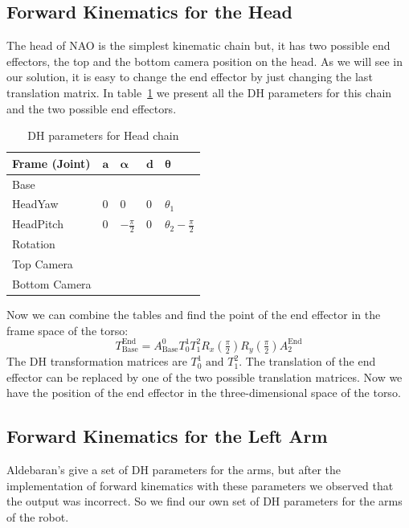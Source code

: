 \subsection{Forward Kinematics for the Head}
The head of NAO is the simplest kinematic chain but, it has two possible end effectors, the top and the bottom camera position on the head. As we will see in our solution, it is easy to change the end effector by just changing the last translation matrix. In table~\ref{tab:DHhead} we present all the DH parameters for this chain and the two possible end effectors. 
\begin{table}[h]
\centering
\caption{DH parameters for Head chain}
\begin{tabular}{|l|>{\centering\arraybackslash}m{2.55cm}|>{\centering\arraybackslash}m{2.55cm}|>{\centering\arraybackslash}m{2.55cm}|>{\centering\arraybackslash}m{2.55cm}|}
\hline
\textbf{Frame (Joint)} & $\mathbf{a}$ & $\boldsymbol{\alpha}$ & $\mathbf{d}$ & $\boldsymbol{\theta}$\\ \hline
Base & \multicolumn{4}{c|}{$A(0,0,\text{\footnotesize{NeckOffsetZ}})$} \\ \hline
HeadYaw & $0$ & $0$ & $0$ & $\theta_1$ \\ \hline
HeadPitch & $0$ & $-\frac{\pi}{2}$ & $0$ & $\theta_2 - \frac{\pi}{2}$ \\ \hline
Rotation & \multicolumn{4}{c|}{$R_x(\frac{\pi}{2})R_y(\frac{\pi}{2})$} \\ \hline
Top Camera & \multicolumn{4}{c|}{$A(\text{\footnotesize{topCameraX}},0,\text{\footnotesize{topCameraZ}})$} \\ \hline
Bottom Camera & \multicolumn{4}{c|}{$A(\text{\footnotesize{bottomCameraX}},0,\text{\footnotesize{bottomCameraZ}})$} \\ \hline
\end{tabular}
\label{tab:DHhead}
\end{table}
Now we can combine the tables and find the point of the end effector in the frame space of the torso:
\[
T^\text{End}_\text{Base} = A^0_\text{Base}T^1_0T^2_1R_x(\tfrac{\pi}{2})R_y(\tfrac{\pi}{2})A^\text{End}_{2}
\]
The DH transformation matrices are $T^1_0\text{ and }T^2_1$. The translation of the end effector can be replaced by one of the two possible translation matrices. Now we have the position of the end effector in the three-dimensional space of the torso.

\subsection{Forward Kinematics for the Left Arm}
Aldebaran's give a set of DH parameters for the arms, but after the implementation of forward kinematics with these parameters we observed that the output was incorrect. So we find our own set of DH parameters for the arms of the robot.

